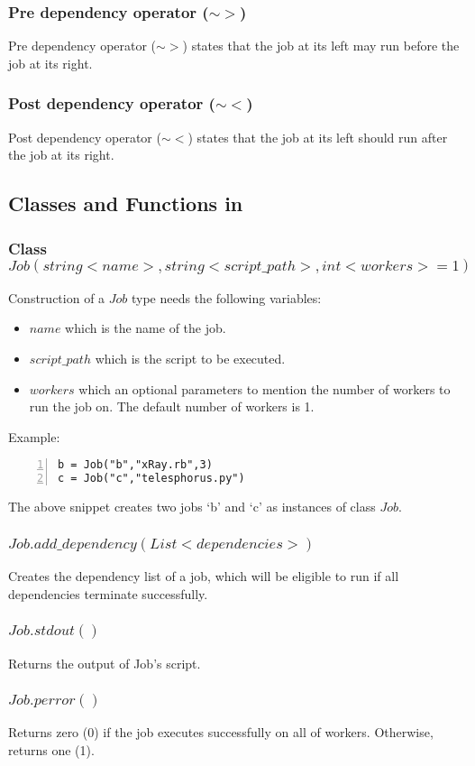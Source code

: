 \subsubsection*{Pre dependency operator ($\sim>$)}
Pre dependency operator ($\sim>$) states that the job at its left may run before the job
at its right.
\subsubsection*{Post dependency operator ($\sim<$)}
Post dependency operator ($\sim<$) states that the job at its left should run after the job
at its right.

\subsection*{Classes and Functions in \lang{}}
\subsubsection*{Class $Job(string <name>, string <script\_path>, int <workers>=1)$}
Construction of a $Job$ type needs the following variables:
\begin{itemize}
\item $name$ which is the name of the job.
\item $script\_path$ which is the script to be executed.
\item $workers$ which an optional parameters to mention the number of workers to run the job on. The default number of workers is 1.
\end{itemize}
Example:\\
\begin{Verbatim}[numbers=left]
b = Job("b","xRay.rb",3)
c = Job("c","telesphorus.py")
\end{Verbatim}
The above snippet creates two jobs `b' and `c' as instances of class $Job$.
\subsubsection*{$Job.add\_dependency(List <dependencies>)$}
Creates the dependency list of a job, which will be eligible to run if all dependencies terminate successfully.
\subsubsection*{$Job.stdout()$}
Returns the output of Job's script.
\subsubsection*{$Job.perror()$}
Returns zero (0) if the job executes successfully on all of workers. Otherwise, returns one (1).
